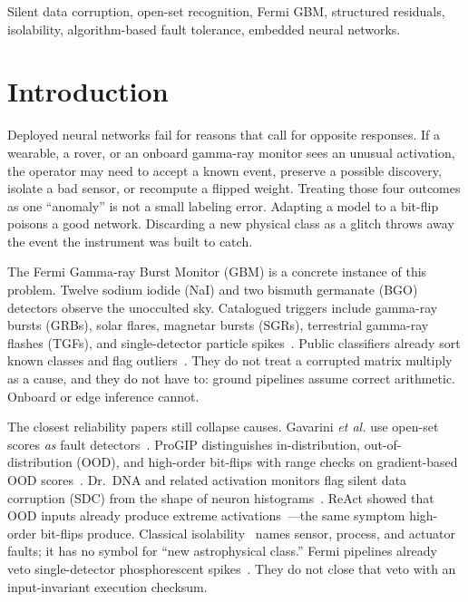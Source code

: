 \documentclass{ieeeaccess}
\begin{document}
\begin{keywords}
Silent data corruption, open-set recognition, Fermi GBM, structured residuals, isolability, algorithm-based fault tolerance, embedded neural networks.
\end{keywords}

\titlepgskip=-15pt

\maketitle

\section{Introduction}

Deployed neural networks fail for reasons that call for opposite responses. If a wearable, a rover, or an onboard gamma-ray monitor sees an unusual activation, the operator may need to accept a known event, preserve a possible discovery, isolate a bad sensor, or recompute a flipped weight. Treating those four outcomes as one ``anomaly'' is not a small labeling error. Adapting a model to a bit-flip poisons a good network. Discarding a new physical class as a glitch throws away the event the instrument was built to catch.

The Fermi Gamma-ray Burst Monitor (GBM) is a concrete instance of this problem. Twelve sodium iodide (NaI) and two bismuth germanate (BGO) detectors observe the unocculted sky. Catalogued triggers include gamma-ray bursts (GRBs), solar flares, magnetar bursts (SGRs), terrestrial gamma-ray flashes (TGFs), and single-detector particle spikes~\cite{meegan2009}. Public classifiers already sort known classes and flag outliers~\cite{john2025}. They do not treat a corrupted matrix multiply as a cause, and they do not have to: ground pipelines assume correct arithmetic. Onboard or edge inference cannot.

The closest reliability papers still collapse causes. Gavarini \textit{et al.} use open-set scores \emph{as} fault detectors~\cite{gavarini2022}. ProGIP distinguishes in-distribution, out-of-distribution (OOD), and high-order bit-flips with range checks on gradient-based OOD scores~\cite{progip2025}. Dr.~DNA and related activation monitors flag silent data corruption (SDC) from the shape of neuron histograms~\cite{drdna2024,geissler2023}. ReAct showed that OOD inputs already produce extreme activations~\cite{react2021}---the same symptom high-order bit-flips produce. Classical isolability~\cite{gertler1990} names sensor, process, and actuator faults; it has no symbol for ``new astrophysical class.'' Fermi pipelines already veto single-detector phosphorescent spikes~\cite{goldstein2019,perera2025}. They do not close that veto with an input-invariant execution checksum.
\end{document}
